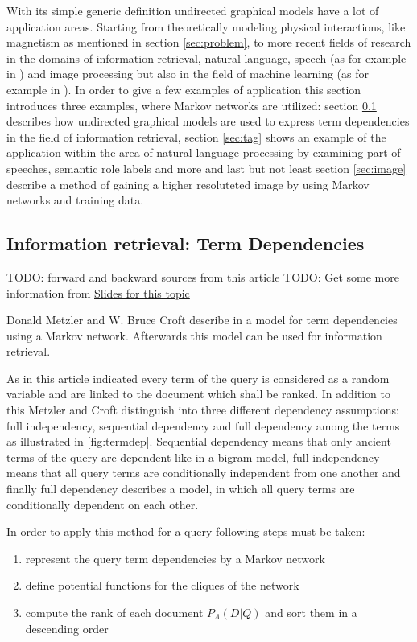 With its simple generic definition undirected graphical models have a lot of application areas. Starting from theoretically modeling physical interactions, like magnetism as mentioned in section \ref{sec:problem}, to more recent fields of research in the domains of information retrieval, natural language, speech (as for example in \cite{}) and image processing but also in the field of machine learning (as for example in \cite{}). In order to give a few examples of application this section introduces three examples, where Markov networks are utilized: section \ref{sec:term} describes how undirected graphical models are used to express term dependencies in the field of information retrieval, section \ref{sec:tag} shows an example of the application within the area of natural language processing by examining part-of-speeches, semantic role labels and more and last but not least section \ref{sec:image} describe a method of gaining a higher resoluteted image by using Markov networks and training data.

\subsection{Information retrieval: Term Dependencies}
\label{sec:term}

TODO: forward and backward sources from this article \cite{metzler2005markov}
TODO: Get some more information from \href{http:\\www.slideplayer.com/slide/6012545}{Slides for this topic}

Donald Metzler and W. Bruce Croft describe in \cite{metzler2005markov} a model for term dependencies using a Markov network. Afterwards this model can be used for information retrieval.

As in this article indicated every term of the query is considered as a random variable and are linked to the document which shall be ranked. In addition to this Metzler and Croft distinguish into three different dependency assumptions: full independency, sequential dependency and full dependency among the terms as illustrated in \ref{fig:termdep}. Sequential dependency means that only ancient terms of the query are dependent like in a bigram model, full independency means that all query terms are conditionally independent from one another and finally full dependency describes a model, in which all query terms are conditionally dependent on each other.

In order to apply this method for a query following steps must be taken:
\begin{enumerate}
\item represent the query term dependencies by a Markov network
\item define potential functions for the cliques of the network
\item compute the rank of each document $P_\Lambda (D|Q)$ and sort them in a descending order
\end{enumerate}


